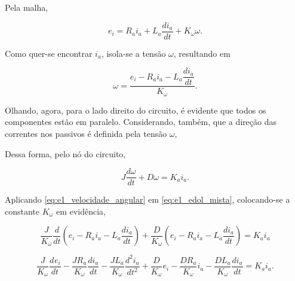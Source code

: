 \documentclass{article}
\numberwithin{equation}{section}
\newcommand{\dei}[1]{\dfrac{d^{#1}e_i}{dt^{#1}}}
\let\l\left
\let\r\right
\let\dfr\dfrac
\begin{document}
\noindent Pela malha,

\begin{equation*}
    e_i = R_a i_a + L_a \dfr{di_a}{dt} + K_{\omega}\omega.
\end{equation*}

\noindent Como quer-se encontrar $i_a$, isola-se a tensão $\omega$, resultando em

\begin{equation}
    \omega = \dfr{e_i - R_a i_a - L_a \dfr{di_a}{dt}}{K_{\omega}}. \label{eq:e1_velocidade_angular}
\end{equation}

\noindent Olhando, agora, para o lado direito do circuito, é evidente que todos os componentes estão em paralelo. Considerando, também, que a direção das correntes nos passivos é definida pela tensão $\omega$,

\begin{center}
\end{center}

\noindent Dessa forma, pelo nó do circuito,

\begin{equation}
    J \dfr{d\omega}{dt} + D \omega = K_a i_a. \label{eq:e1_edol_mista}
\end{equation}

\noindent Aplicando \eqref{eq:e1_velocidade_angular} em \eqref{eq:e1_edol_mista}, colocando-se a constante $K_{\omega}$ em evidência,

\begin{equation*}
    \dfr{J}{K_{\omega}} \dfr{d}{dt}\l( e_i - R_a i_a - L_a \dfr{di_a}{dt} \r) + \dfr{D}{K_{\omega}} \l( e_i - R_a i_a - L_a \dfr{di_a}{dt} \r) = K_a i_a
\end{equation*}

\begin{equation*}
    \dfr{J}{K_{\omega}} \dei{ } - \dfr{J R_a}{K_{\omega}} \dfr{di_a}{dt} - \dfr{J L_a}{K_{\omega}} \dfr{d^2i_a}{dt^2} + \dfr{D}{K_{\omega}} e_i - \dfr{D R_a}{K_{\omega}} i_a - \dfr{D L_a}{K_{\omega}} \dfr{di_a}{dt} = K_a i_a.
\end{equation*}
\end{document}
